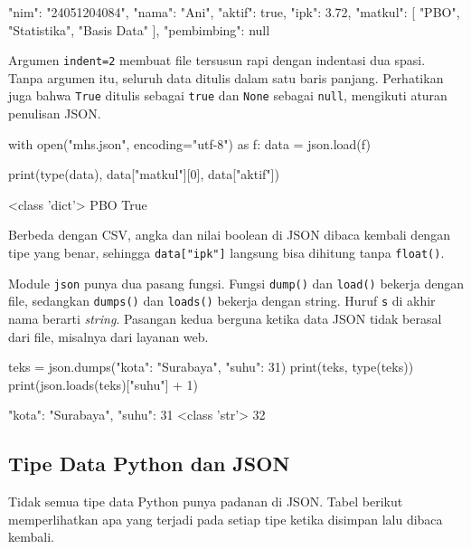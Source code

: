 \begin{keluaran}
{
  "nim": "24051204084",
  "nama": "Ani",
  "aktif": true,
  "ipk": 3.72,
  "matkul": [
    "PBO",
    "Statistika",
    "Basis Data"
  ],
  "pembimbing": null
}
\end{keluaran}

Argumen \texttt{indent=2} membuat file tersusun rapi dengan indentasi dua spasi. Tanpa argumen itu, seluruh data ditulis dalam satu baris panjang. Perhatikan juga bahwa \texttt{True} ditulis sebagai \texttt{true} dan \texttt{None} sebagai \texttt{null}, mengikuti aturan penulisan JSON.

\begin{kode}
with open("mhs.json", encoding="utf-8") as f:
    data = json.load(f)

print(type(data), data["matkul"][0], data["aktif"])
\end{kode}

\begin{keluaran}
<class 'dict'> PBO True
\end{keluaran}

Berbeda dengan CSV, angka dan nilai boolean di JSON dibaca kembali dengan tipe yang benar, sehingga \texttt{data["ipk"]} langsung bisa dihitung tanpa \texttt{float()}.

Module \texttt{json} punya dua pasang fungsi. Fungsi \texttt{dump()} dan \texttt{load()} bekerja dengan file, sedangkan \texttt{dumps()} dan \texttt{loads()} bekerja dengan string. Huruf \texttt{s} di akhir nama berarti \emph{string}. Pasangan kedua berguna ketika data JSON tidak berasal dari file, misalnya dari layanan web.

\begin{kode}
teks = json.dumps({"kota": "Surabaya", "suhu": 31})
print(teks, type(teks))
print(json.loads(teks)["suhu"] + 1)
\end{kode}

\begin{keluaran}
{"kota": "Surabaya", "suhu": 31} <class 'str'>
32
\end{keluaran}

\subsection{Tipe Data Python dan JSON}

Tidak semua tipe data Python punya padanan di JSON. Tabel berikut memperlihatkan apa yang terjadi pada setiap tipe ketika disimpan lalu dibaca kembali.

